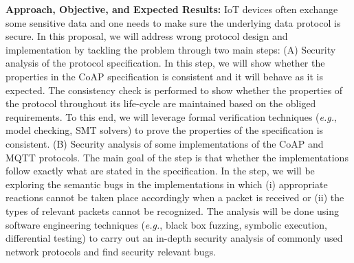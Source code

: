 \documentclass[10pt,onecolumn]{article}
\newcommand{\eg}{\textit{e.g.}\xspace}
\begin{document}
\noindent\textbf{Approach, Objective, and Expected Results:} IoT devices often exchange some sensitive data and one needs to make sure the underlying data protocol is secure. In this proposal, we will address wrong protocol design and implementation by tackling the problem through two main steps: (A) Security analysis of the protocol specification. In this step, we will show whether the properties in the CoAP specification is consistent and it will behave as it is expected. The consistency check is performed to show whether the properties of the protocol throughout its life-cycle are maintained based on the obliged requirements. To this end, we will leverage formal verification techniques (\eg, model checking, SMT solvers) to prove the properties of the specification is consistent. (B) Security analysis of some implementations of the CoAP and MQTT protocols. The main goal of the step is that whether the implementations follow exactly what are stated in the specification. In the step, we will be exploring the semantic bugs in the implementations in which (i) appropriate reactions cannot be taken place accordingly when a packet is received or (ii) the types of relevant packets cannot be recognized. The analysis will be done using software engineering techniques (\eg, black box fuzzing, symbolic execution, differential testing) to carry out an in-depth security analysis of commonly used network protocols and find security relevant bugs. 


%
%
\end{document}

